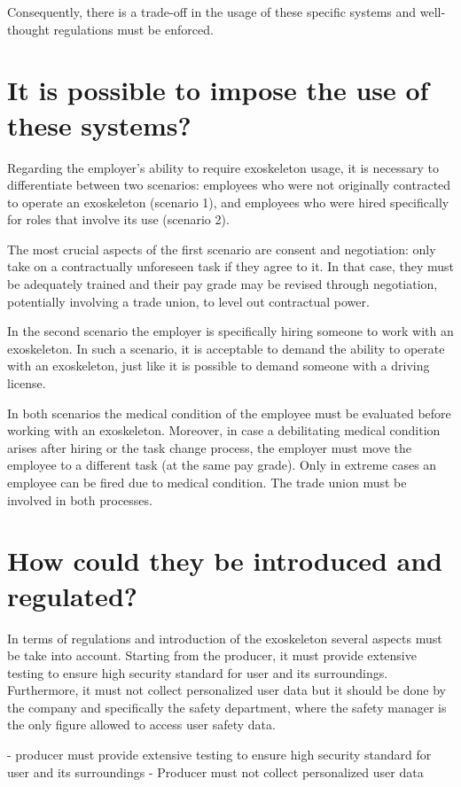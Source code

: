 \documentclass{article}
\begin{document}
Consequently, there is a trade-off in the usage of these specific systems and well-thought regulations must be enforced.


\section{It is possible to impose the use of these systems?}

Regarding the employer’s ability to require exoskeleton usage, it is necessary to differentiate between two scenarios: employees who were not originally contracted to operate an exoskeleton (scenario 1), and employees who were hired specifically for roles that involve its use (scenario 2).

The most crucial aspects of the first scenario are consent and negotiation: only take on a contractually unforeseen task if they agree to it.
In that case, they must be adequately trained and their pay grade may be revised through negotiation, potentially involving a trade union, to level out contractual power.  

In the second scenario the employer is specifically hiring someone to work with an exoskeleton. In such a scenario, it is acceptable to demand the ability to operate with an exoskeleton, just like it is possible to demand someone with a driving license. 

In both scenarios the medical condition of the employee must be evaluated before working with an exoskeleton. 
Moreover, in case a debilitating medical condition arises after hiring or the task change process, the employer must move the employee to a different task (at the same pay grade). Only in extreme cases an employee can be fired due to medical condition. The trade union must be involved in both processes. 

\section{How could they be introduced and regulated?}
In terms of regulations and introduction of the exoskeleton several aspects must be take into account.
Starting from the producer, it must provide extensive testing to ensure high security standard for user and its surroundings. Furthermore, it must not collect personalized user data but it should be done by the company and specifically the safety department, where the safety manager is the only figure allowed to access user safety data.

- producer must provide extensive testing to ensure high security standard for user and its surroundings
- Producer must not collect personalized user data 
\end{document}
